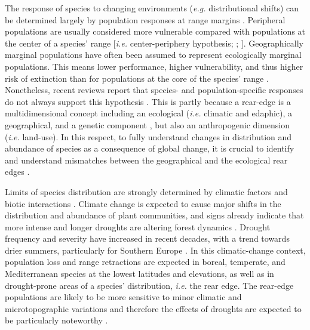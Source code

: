 The response of species to changing environments (\emph{e.g.} distributional shifts) can be determined largely by population responses at range margins \autocite{HampePetit2005ConservingBiodiversity}. Peripheral populations are usually considered more vulnerable compared with populations at the center of a species' range {[}\emph{i.e.} center-periphery hypothesis; \textcite{SagarinGaines2002AbundantCentre}; \textcite{Pirononetal2017GeographicVariation}{]}. Geographically marginal populations have often been assumed to represent ecologically marginal populations. This means lower performance, higher vulnerability, and thus higher risk of extinction than for populations at the core of the species' range \autocite{Rehmetal2015LosingYour,Pirononetal2017GeographicVariation,VilaCabreraetal2019RefiningPredictions}. Nonetheless, recent reviews report that species- and population-specific responses do not always support this hypothesis \autocite{Sextonetal2009EvolutionEcology,Abelietal2014EffectsMarginality,Oldfatheretal2020RangeEdges}. This is partly because a rear-edge is a multidimensional concept including an ecological (\emph{i.e.} climatic and edaphic), a geographical, and a genetic component \autocite{VilaCabreraetal2019RefiningPredictions}, but also an anthropogenic dimension (\emph{i.e.} land-use). In this respect, to fully understand changes in distribution and abundance of species as a consequence of global change, it is crucial to identify and understand mismatches between the geographical and the ecological rear edges \autocite{VilaCabreraJump2019GreaterGrowth}.

Limits of species distribution are strongly determined by climatic factors and biotic interactions \autocite{Gaston2009GeographicRange,Sextonetal2009EvolutionEcology}. Climate change is expected to cause major shifts in the distribution and abundance of plant communities, and signs already indicate that more intense and longer droughts are altering forest dynamics \autocite{Allenetal2010GlobalOverview}. Drought frequency and severity have increased in recent decades, with a trend towards drier summers, particularly for Southern Europe \autocite{VicenteSerranoetal2014EvidenceIncreasing,Staggeetal2017ObservedDrought}. In this climatic-change context, population loss and range retractions are expected in boreal, temperate, and Mediterranean species at the lowest latitudes and elevations, as well as in drought-prone areas of a species' distribution, \emph{i.e.} the rear edge. The rear-edge populations are likely to be more sensitive to minor climatic and microtopographic variations and therefore the effects of droughts are expected to be particularly noteworthy \autocite{HampePetit2005ConservingBiodiversity,VilaCabreraetal2019RefiningPredictions}.

